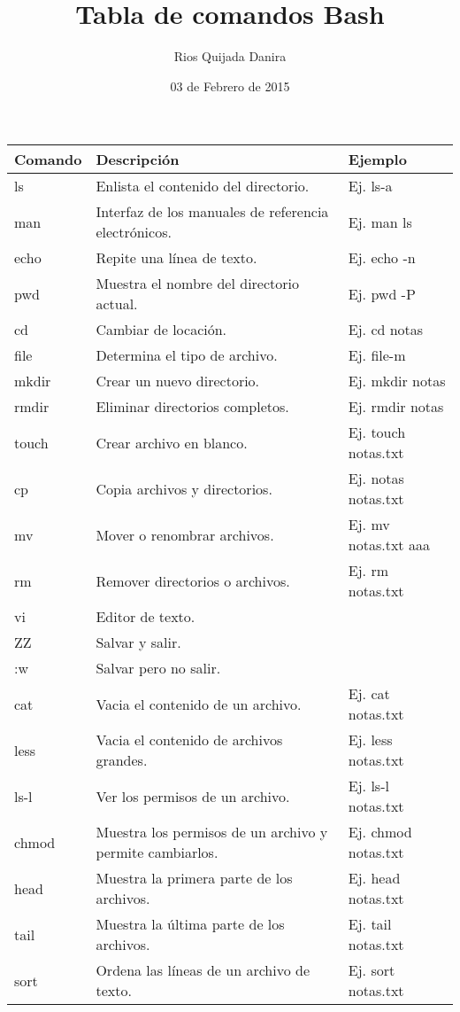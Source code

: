 \documentclass[10pt]{article}
\title{Tabla de comandos Bash}
\author{Rios Quijada Danira}
\date{03 de Febrero de 2015}
\begin{document}
\maketitle
\begin{tabular}{||l|l|l||}
\hline \hline
Comando & Descripción & Ejemplo \\
\hline
ls & Enlista el contenido del directorio. & Ej. ls-a \\ \hline
man & Interfaz de los manuales de referencia electrónicos. & Ej. man ls \\ \hline
echo & Repite una línea de texto. & Ej. echo -n \\ \hline
pwd & Muestra el nombre del directorio actual. & Ej. pwd -P \\ \hline
cd & Cambiar de locación. & Ej. cd notas \\ \hline
file & Determina el tipo de archivo. & Ej. file-m \\ \hline
mkdir & Crear un nuevo directorio. & Ej. mkdir notas \\ \hline
rmdir & Eliminar directorios completos. & Ej. rmdir notas \\ \hline
touch & Crear archivo en blanco. & Ej. touch notas.txt \\ \hline
cp & Copia archivos y directorios. & Ej. notas notas.txt  \\ \hline
mv & Mover o renombrar archivos. & Ej. mv notas.txt aaa \\ \hline
rm & Remover directorios o archivos. & Ej. rm notas.txt \\ \hline
vi & Editor de texto. &  \\ \hline
ZZ & Salvar y salir. & \\ \hline
:w & Salvar pero no salir.& \\ \hline
cat & Vacia el contenido de un archivo. & Ej. cat notas.txt \\ \hline
less & Vacia el contenido de archivos grandes. & Ej. less notas.txt \\ \hline
ls-l & Ver los permisos de un archivo. &  Ej. ls-l notas.txt\\ \hline
chmod & Muestra los permisos de un archivo y permite cambiarlos. & Ej. chmod notas.txt \\ \hline
head & Muestra la primera parte de los archivos. & Ej. head notas.txt \\ \hline
tail & Muestra la última parte de los archivos. & Ej. tail notas.txt \\ \hline
sort & Ordena las líneas de un archivo de texto. & Ej. sort notas.txt \\ \hline

\end{tabular}
\end{document}
